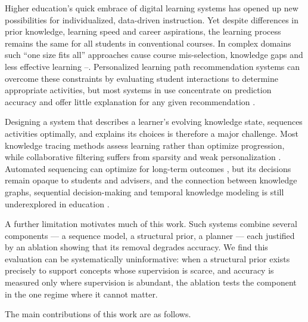 Higher education's quick embrace of digital learning systems has opened up new
possibilities for individualized, data-driven instruction. Yet despite differences in
prior knowledge, learning speed and career aspirations, the learning process remains the
same for all students in conventional courses. In complex domains such ``one size fits
all'' approaches cause course mis-selection, knowledge gaps and less effective learning
\cite{li2026survey}--\cite{kuzilek2017oulad}. Personalized learning path recommendation
systems can overcome these constraints by evaluating student interactions to determine
appropriate activities, but most systems in use concentrate on prediction accuracy and
offer little explanation for any given recommendation \cite{corbett1994knowledge}.

Designing a system that describes a learner's evolving knowledge state, sequences
activities optimally, and explains its choices is therefore a major challenge. Most
knowledge tracing methods assess learning rather than optimize progression, while
collaborative filtering suffers from sparsity and weak personalization
\cite{piech2015dkt, zhang2017dkvmn}. Automated sequencing can optimize for long-term
outcomes \cite{ghosh2020akt}\cite{shen2021lpkt}, but its decisions remain opaque to
students and advisers, and the connection between knowledge graphs, sequential
decision-making and temporal knowledge modeling is still underexplored in education
\cite{kipf2017gcn, mnih2015dqn}.

A further limitation motivates much of this work. Such systems combine several
components --- a sequence model, a structural prior, a planner --- each justified by an
ablation showing that its removal degrades accuracy. We find this evaluation can be
systematically uninformative: when a structural prior exists precisely to support concepts
whose supervision is scarce, and accuracy is measured only where supervision is abundant,
the ablation tests the component in the one regime where it cannot matter.

The main contributions of this work are as follows.

